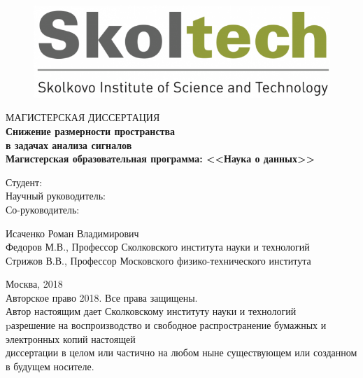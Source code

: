 \documentclass[12pt,oneside]{article}
\theoremstyle{definition}
\newcommand{\borders}{\tikz[remember picture,overlay] \draw []
	(current page text area.south west)
	rectangle
	(current page text area.north east)
	;}
\begin{document}
	\newpage
	\pagestyle{empty}
	
	\begin{figure}
		\vspace{1.7cm}
		\centering
		\includegraphics[width=0.38\linewidth]{sk_logo}
	\end{figure}
	\begin{center}
		\sc 
			МАГИСТЕРСКАЯ ДИССЕРТАЦИЯ\\[5mm]
		\bf {\large
		Снижение размерности пространства \\в задачах анализа сигналов}\\[19mm]
		\rm
		Магистерская образовательная программа: <<Наука о данных>>\\[10mm]
	\end{center}
	\begin{minipage}{0.5\linewidth}
		\begin{flushright}
			Студент: \hphantom{1}\\[12mm]
			Научный руководитель: \hphantom{1}\\[12mm]
			Со-руководитель: \hphantom{1}\\
		\end{flushright}
	\end{minipage}%
	\begin{minipage}{0.48\linewidth}
		\vspace{.52cm}
		\begin{flushleft}
			Исаченко Роман Владимирович\\[12mm]
			Федоров М.В., Профессор Сколковского института науки и технологий\\[6.8mm]
			Стрижов В.В., Профессор Московского физико-технического института\\
		\end{flushleft}
	\end{minipage}%
	
	\vfill
	\begin{center}
		Москва, 2018 \\[9mm]
		\scriptsize{
			Авторское право 2018. Все права защищены. \\[7mm]
			
			Автор настоящим дает Сколковскому институту науки и технологий \\
			pазрешение на воспроизводство и свободное распространение бумажных и электронных копий настоящей \\ диссертации в целом или частично на любом ныне существующем или созданном в будущем носителе. \\[12mm]}
	\end{center}
\end{document}
